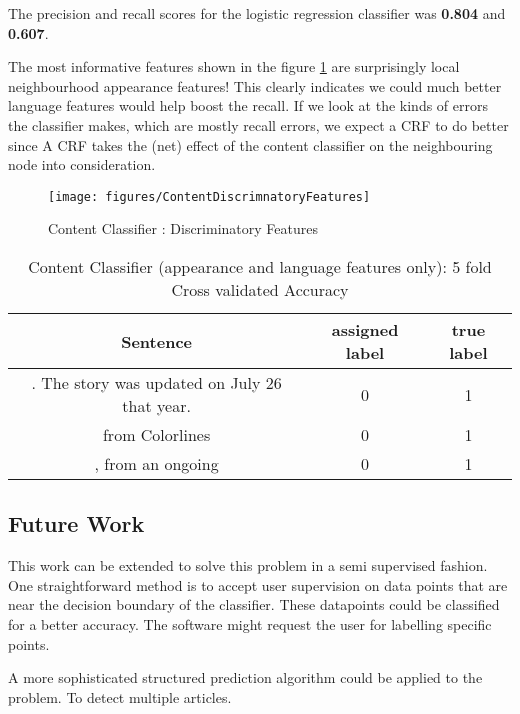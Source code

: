 \documentclass{article} %
\begin{document}
The precision and recall scores for the logistic regression classifier was \textbf{0.804} and \textbf{0.607}.

The most informative features shown in the figure \ref{fig:disc} are surprisingly local neighbourhood appearance features! This clearly indicates we could much better language features would help boost the recall. If we look at the kinds of errors the classifier makes, which are mostly recall errors, we expect a CRF  to do better since A CRF takes the (net) effect of the content classifier on the neighbouring node into consideration.

\begin{figure}[h]
\begin{center}
\texttt{[image: figures/ContentDiscrimnatoryFeatures]}
\end{center}
\caption{Content Classifier : Discriminatory Features}\label{fig:disc}
\end{figure}

\begin{table}
  \centering%
  \begin{tabular}{c|c|c}
 \hline
 Sentence & assigned label & true label  \\ [0.5ex] 
 \hline\hline
 \hline
 . The story was updated on July 26 that year. & 0  & 1  \\
 \hline
 from Colorlines & 0 & 1  \\
 \hline
 , from an ongoing & 0  & 1  \\
 \hline
 
 \hline
  \end{tabular}
 \caption{Content Classifier (appearance and language features only): 5 fold Cross validated Accuracy}\label{table:somename}
\end{table}








\subsection{Future Work}
This work can be extended to  solve this problem in a semi supervised fashion. One straightforward method is to accept user supervision on data points that are near the decision boundary of the classifier. These datapoints could be classified for a better accuracy. The software might request the user for labelling specific points.

A more sophisticated structured prediction algorithm could be applied to the problem. To detect multiple articles.




\end{document}
